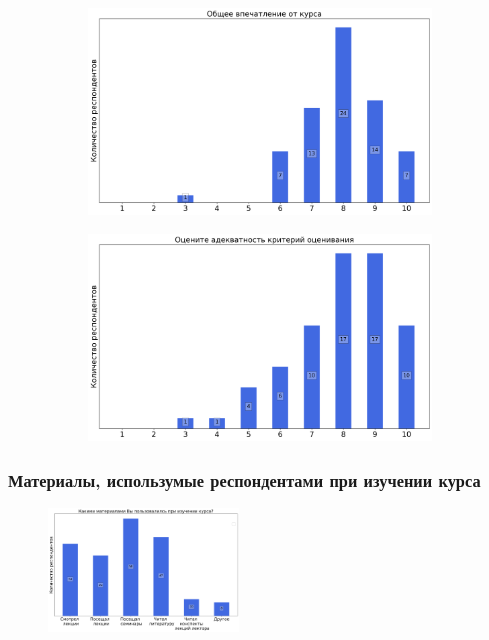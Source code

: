 		\begin{figure}[H]
			\centering
			\begin{subfigure}[b]{0.45\textwidth}
				\centering
				\includegraphics[width=\textwidth]{images/1 course/Математический анализ/general-0.png}
			\end{subfigure}
			\begin{subfigure}[b]{0.45\textwidth}
				\centering
				\includegraphics[width=\textwidth]{images/1 course/Математический анализ/general-1.png}
			\end{subfigure}	
		\end{figure}

	\subsubsection{Материалы, использумые респондентами при изучении курса}

		\begin{figure}[H]
			\centering
			\includegraphics[width = 0.45\textwidth]{images/1 course/Математический анализ/materials.png}
		\end{figure}


